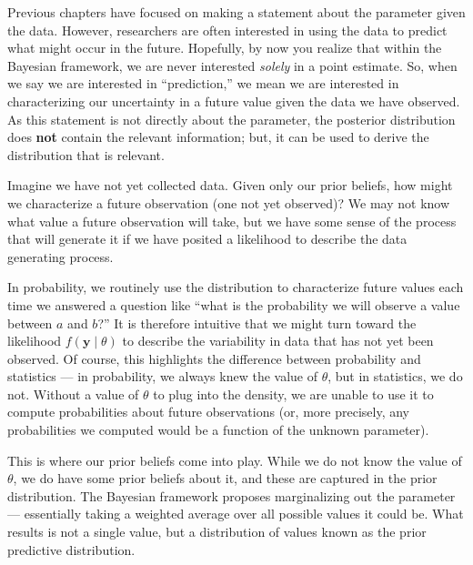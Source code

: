\documentclass[
  letterpaper,
  DIV=11,
  numbers=noendperiod]{scrreprt}
\theoremstyle{definition}
\theoremstyle{definition}
\theoremstyle{plain}
\theoremstyle{remark}
\begin{document}
\providecommand{\norm}[1]{\lVert#1\rVert}
\providecommand{\abs}[1]{\lvert#1\rvert}
\providecommand{\iid}{\stackrel{\text{IID}}{\sim}}
\providecommand{\ind}{\stackrel{\text{Ind}}{\sim}}

\providecommand{\bm}[1]{\mathbf{#1}}
\providecommand{\bs}[1]{\boldsymbol{#1}}
\providecommand{\bbeta}{\bs{\beta}}

\providecommand{\Ell}{\mathcal{L}}
\providecommand{\indep}{\perp\negthickspace\negmedspace\perp}

Previous chapters have focused on making a statement about the parameter
given the data. However, researchers are often interested in using the
data to predict what might occur in the future. Hopefully, by now you
realize that within the Bayesian framework, we are never interested
\emph{solely} in a point estimate. So, when we say we are interested in
``prediction,'' we mean we are interested in characterizing our
uncertainty in a future value given the data we have observed. As this
statement is not directly about the parameter, the posterior
distribution does \textbf{not} contain the relevant information; but, it
can be used to derive the distribution that is relevant.

Imagine we have not yet collected data. Given only our prior beliefs,
how might we characterize a future observation (one not yet observed)?
We may not know what value a future observation will take, but we have
some sense of the process that will generate it if we have posited a
likelihood to describe the data generating process.

In probability, we routinely use the distribution to characterize future
values each time we answered a question like ``what is the probability
we will observe a value between \(a\) and \(b\)?'' It is therefore
intuitive that we might turn toward the likelihood
\(f(\mathbf{y} \mid \theta)\) to describe the variability in data that
has not yet been observed. Of course, this highlights the difference
between probability and statistics --- in probability, we always knew
the value of \(\theta\), but in statistics, we do not. Without a value
of \(\theta\) to plug into the density, we are unable to use it to
compute probabilities about future observations (or, more precisely, any
probabilities we computed would be a function of the unknown parameter).

This is where our prior beliefs come into play. While we do not know the
value of \(\theta\), we do have some prior beliefs about it, and these
are captured in the prior distribution. The Bayesian framework proposes
marginalizing out the parameter --- essentially taking a weighted
average over all possible values it could be. What results is not a
single value, but a distribution of values known as the prior predictive
distribution.
\end{document}
